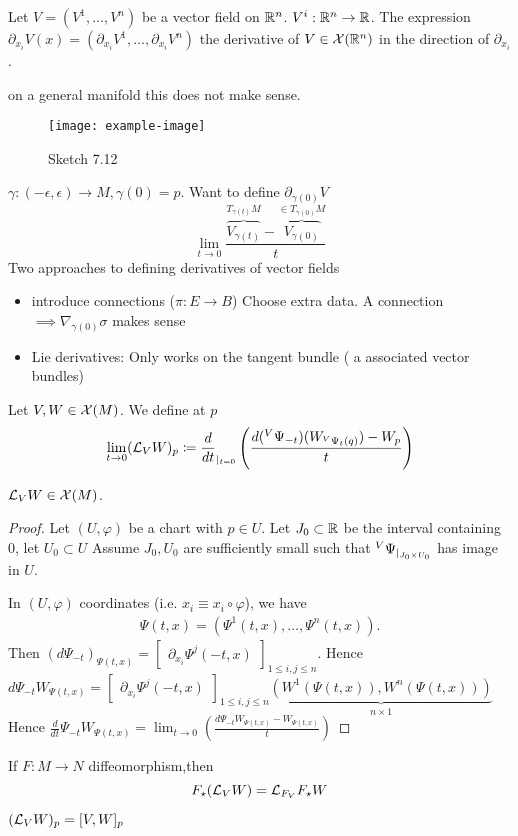 Let \(V=(V^1,\dots,V^n)\) be a vector field on \(\mathbb{R}^n\). \(V^i:\mathbb{R}^n\to \mathbb{R}\). The expression \(\partial_{x_i} V(x)=(\partial_{x_i} V^1,\dots,\partial_{x_i} V^n)\)
the derivative of \(V\in \mathcal{X}(\mathbb{R}^n)\) in the direction of \(\partial_{x_i}\).

 on a general manifold this does not make sense.
\begin{figure}[H]\label{fig:7.12}
    \centering
    \texttt{[image: example-image]}
    \caption{Sketch 7.12}
\end{figure}

\(\gamma:(-\epsilon,\epsilon)\to M,\gamma(0)=p\). Want to define \(\partial_{\gamma(0)}V\)
\[\lim_{t\to 0}\frac{\overbrace{V_{\gamma(t)}}^{T_{\gamma(t)}M}-\overbrace{V_{\gamma(0)}}^{\in T_{\gamma(0)}M}}{t}\]
Two approaches to defining derivatives  of vector fields
\begin{itemize}
    \item introduce connections (\(\pi:E\to B\)) Choose extra data. A connection \(\implies \nabla_{\gamma(0)}\sigma\) makes sense    
    \item Lie derivatives: Only works on the tangent bundle ( a associated vector bundles)
\end{itemize}

\begin{definition*}
    Let \(V,W\in \mathcal{X}(M)\). We define at \(p\) \[\lim_{t\to 0}(\mathcal{L}_VW)_p\coloneqq \frac{d}{dt}_{|_{t=0}}
    \left(\frac{d({}^V\Psi_{-t})(W_{{}^V\Psi_t(q)})-W_p}{t}\right)\]
\end{definition*}

\begin{lemma}\label{lem:7.13}
    \(\mathcal{L}_VW\in \mathcal{X}(M)\).
\end{lemma}

\begin{proof}
    Let \((U,\varphi)\) be a chart with \(p\in U\). Let \(J_0\subset \mathbb{R}\) be the interval containing \(0\), let \(U_0\subset U\)
    Assume \(J_0,U_0\) are sufficiently small such that \( {}^V \Psi_{|_{J_0\times U_0}}\)
    has image in \(U\).

    In \((U,\varphi)\) coordinates (i.e. \(x_i\equiv x_i\circ \varphi\)), we have 
    \begin{align*}
        \Psi(t,x)=(\Psi^1(t,x),\dots,\Psi^{n}(t,x)).
    \end{align*}
    Then \((d\Psi_{-t})_{\Psi(t,x)}=\begin{bmatrix}
        \partial_{x_i}\Psi^{j}(-t,x)
    \end{bmatrix}_{1\leq i,j\leq n}\). Hence 
    \(d\Psi_{-t}W_{\Psi(t,x)}=\begin{bmatrix}
        \partial_{x_i}\Psi^{j}(-t,x)
    \end{bmatrix}_{1\leq i,j\leq n} \underbrace{(W^1(\Psi(t,x)),W^n(\Psi(t,x)))}_{n\times 1}\)
    Hence \(\frac{d}{dt}\Psi_{-t}W_{\Psi(t,x)}=\lim_{t\to 0}\left(\frac{d\Psi_{-t}W_{\Psi(t,x)}-W_{\Psi(t,x)}}{t}\right)\)
\end{proof}

\begin{remark}
    If \(F:M\to N\) diffeomorphism,then 
    \[F_\star(\mathcal{L}_VW)=\mathcal{L}_{F_V}F_\star W\]
\end{remark}

\begin{lemma}\label{lem:7.14}
    \((\mathcal{L}_VW)_p=[V,W]_p\)
\end{lemma}

